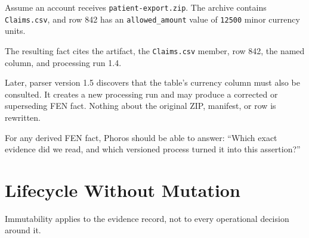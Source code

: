 \documentclass[11pt]{article}
\newcommand{\code}[1]{\texttt{#1}}
\begin{document}
Assume an account receives \code{patient-export.zip}. The archive contains \code{Claims.csv}, and row 842 has an \code{allowed\_amount} value of \code{12500} minor currency units.

\begin{center}
\end{center}

The resulting fact cites the artifact, the \code{Claims.csv} member, row 842, the named column, and processing run 1.4.

Later, parser version 1.5 discovers that the table's currency column must also be consulted. It creates a new processing run and may produce a corrected or superseding FEN fact. Nothing about the original ZIP, manifest, or row is rewritten.

\begin{principlebox}
For any derived FEN fact, Phoros should be able to answer: ``Which exact evidence did we read, and which versioned process turned it into this assertion?''
\end{principlebox}

\Needspace{0.25\textheight}
\section{Lifecycle Without Mutation}

Immutability applies to the evidence record, not to every operational decision around it.
\end{document}
